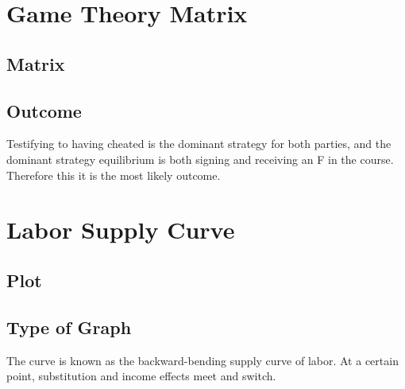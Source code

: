 \documentclass[a4paper]{article}
\begin{document}
\newpage

\section{Game Theory Matrix}

\subsection{Matrix}

\vspace{8cm}

\subsection{Outcome} 
Testifying to having cheated is the dominant strategy for both parties, and the 
dominant strategy equilibrium is both signing and receiving an F in the course. Therefore
this it is the most likely outcome.

\section{Labor Supply Curve}

\subsection{Plot}

\vspace{8cm}

\subsection{Type of Graph} 
The curve is known as the backward-bending supply curve of labor.
At a certain point, substitution and income effects meet and switch.
\end{document}
